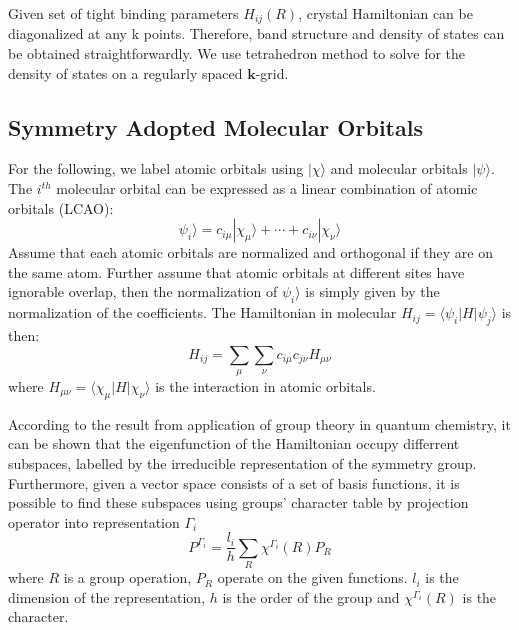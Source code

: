 \documentclass{article}
\begin{document}
Given set of tight binding parameters $H_{ij}(R)$, crystal Hamiltonian can be diagonalized at any k points. Therefore, 
band structure and density of states can be obtained straightforwardly. We use tetrahedron method to solve for 
the density of states on a regularly spaced $\mathbf{k}$-grid. 

\subsection{Symmetry Adopted Molecular Orbitals}
For the following, we label atomic orbitals using $|\chi\rangle$ and molecular orbitals $|\psi\rangle$. The $i^{th}$ molecular 
orbital can be expressed as a linear combination of atomic orbitals (LCAO): 
\begin{equation}
    \psi_i\rangle = c_{i\mu} |\chi_{\mu}\rangle + \cdots + c_{i\nu} |\chi_{\nu}\rangle
\end{equation}
Assume that each atomic orbitals are normalized and orthogonal if they are on the same atom. Further assume 
that atomic orbitals at different sites have ignorable overlap, then the normalization 
of $\psi_i\rangle$ is simply given by the normalization of the coefficients. 
The Hamiltonian in molecular $H_{ij} = \langle \psi_i | H | \psi_j \rangle$ is then:
\begin{equation}
    \label{E:HAO_HMO_transformation}
    H_{ij} = \sum_{\mu} \sum_{\nu} c_{i\mu} c_{j\nu} H_{\mu\nu}
\end{equation}
where $H_{\mu\nu} = \langle \chi_{\mu} | H | \chi_{\nu} \rangle$ is the interaction in atomic orbitals.

According to the result from application of group theory in quantum chemistry, it can be 
shown that the eigenfunction of the Hamiltonian occupy differrent subspaces, labelled by the 
irreducible representation of the symmetry group. Furthermore, given a vector space consists 
of a set of basis functions, it is possible to find these subspaces using groups' character table
by projection operator into representation $\Gamma_i$
\begin{equation}
    P^{\Gamma_i} = \frac{l_i}{h} \sum_R \chi^{\Gamma_i}(R) P_R
\end{equation}
where $R$ is a group operation, $P_R$ operate on the given functions. 
$l_i$ is the dimension of the representation, $h$ is the order of the group and
$\chi^{\Gamma_i}(R)$ is the character. 
\end{document}
